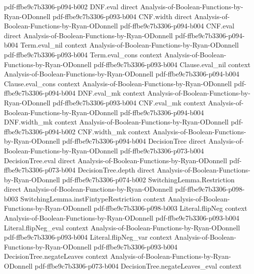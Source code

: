 \begin{theorem}
  {pdf-ffbe9c7b3306-p094-b002}
\proofstep
  {DNF.eval}
  {direct}
  {Analysis-of-Boolean-Functions-by-Ryan-ODonnell}
  {pdf-ffbe9c7b3306-p093-b004}
\proofstep
  {CNF.width}
  {direct}
  {Analysis-of-Boolean-Functions-by-Ryan-ODonnell}
  {pdf-ffbe9c7b3306-p094-b004}
\proofstep
  {CNF.eval}
  {direct}
  {Analysis-of-Boolean-Functions-by-Ryan-ODonnell}
  {pdf-ffbe9c7b3306-p094-b004}
\proofstep
  {Term.eval_nil}
  {context}
  {Analysis-of-Boolean-Functions-by-Ryan-ODonnell}
  {pdf-ffbe9c7b3306-p093-b004}
\proofstep
  {Term.eval_cons}
  {context}
  {Analysis-of-Boolean-Functions-by-Ryan-ODonnell}
  {pdf-ffbe9c7b3306-p093-b004}
\proofstep
  {Clause.eval_nil}
  {context}
  {Analysis-of-Boolean-Functions-by-Ryan-ODonnell}
  {pdf-ffbe9c7b3306-p094-b004}
\proofstep
  {Clause.eval_cons}
  {context}
  {Analysis-of-Boolean-Functions-by-Ryan-ODonnell}
  {pdf-ffbe9c7b3306-p094-b004}
\proofstep
  {DNF.eval_mk}
  {context}
  {Analysis-of-Boolean-Functions-by-Ryan-ODonnell}
  {pdf-ffbe9c7b3306-p093-b004}
\proofstep
  {CNF.eval_mk}
  {context}
  {Analysis-of-Boolean-Functions-by-Ryan-ODonnell}
  {pdf-ffbe9c7b3306-p094-b004}
\proofstep
  {DNF.width_mk}
  {context}
  {Analysis-of-Boolean-Functions-by-Ryan-ODonnell}
  {pdf-ffbe9c7b3306-p094-b002}
\proofstep
  {CNF.width_mk}
  {context}
  {Analysis-of-Boolean-Functions-by-Ryan-ODonnell}
  {pdf-ffbe9c7b3306-p094-b004}
\proofstep
  {DecisionTree}
  {direct}
  {Analysis-of-Boolean-Functions-by-Ryan-ODonnell}
  {pdf-ffbe9c7b3306-p073-b004}
\proofstep
  {DecisionTree.eval}
  {direct}
  {Analysis-of-Boolean-Functions-by-Ryan-ODonnell}
  {pdf-ffbe9c7b3306-p073-b004}
\proofstep
  {DecisionTree.depth}
  {direct}
  {Analysis-of-Boolean-Functions-by-Ryan-ODonnell}
  {pdf-ffbe9c7b3306-p074-b002}
\proofstep
  {SwitchingLemma.Restriction}
  {direct}
  {Analysis-of-Boolean-Functions-by-Ryan-ODonnell}
  {pdf-ffbe9c7b3306-p098-b003}
\proofstep
  {SwitchingLemma.instFintypeRestriction}
  {context}
  {Analysis-of-Boolean-Functions-by-Ryan-ODonnell}
  {pdf-ffbe9c7b3306-p098-b003}
\proofstep
  {Literal.flipNeg}
  {context}
  {Analysis-of-Boolean-Functions-by-Ryan-ODonnell}
  {pdf-ffbe9c7b3306-p093-b004}
\proofstep
  {Literal.flipNeg_eval}
  {context}
  {Analysis-of-Boolean-Functions-by-Ryan-ODonnell}
  {pdf-ffbe9c7b3306-p093-b004}
\proofstep
  {Literal.flipNeg_var}
  {context}
  {Analysis-of-Boolean-Functions-by-Ryan-ODonnell}
  {pdf-ffbe9c7b3306-p093-b004}
\proofstep
  {DecisionTree.negateLeaves}
  {context}
  {Analysis-of-Boolean-Functions-by-Ryan-ODonnell}
  {pdf-ffbe9c7b3306-p073-b004}
\proofstep
  {DecisionTree.negateLeaves_eval}
  {context}

\end{theorem}
